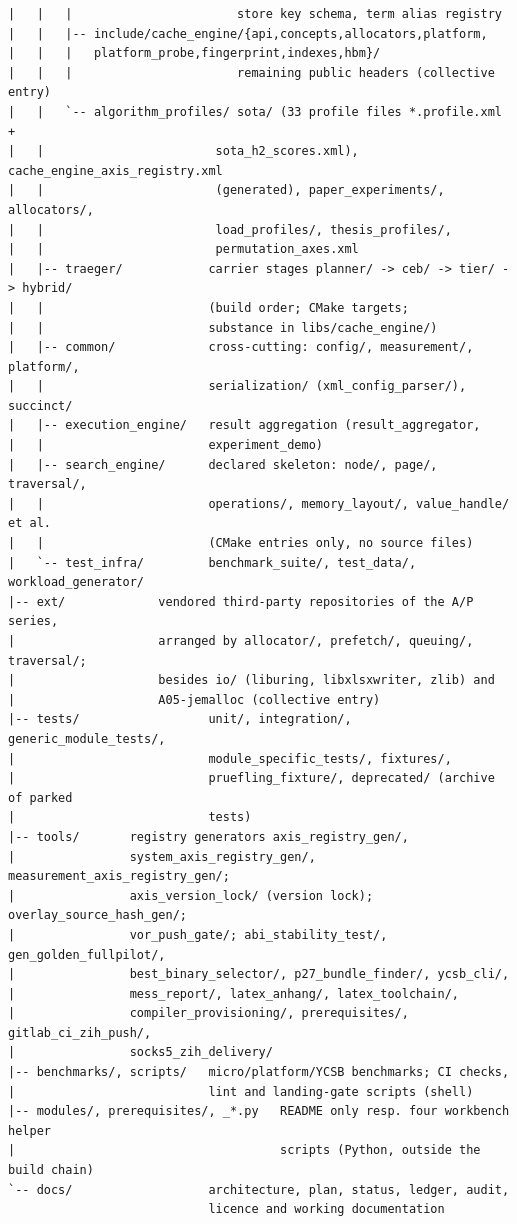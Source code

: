 {\begin{verbatim}
|   |   |                       store key schema, term alias registry
|   |   |-- include/cache_engine/{api,concepts,allocators,platform,
|   |   |   platform_probe,fingerprint,indexes,hbm}/
|   |   |                       remaining public headers (collective entry)
|   |   `-- algorithm_profiles/ sota/ (33 profile files *.profile.xml +
|   |                        sota_h2_scores.xml), cache_engine_axis_registry.xml
|   |                        (generated), paper_experiments/, allocators/,
|   |                        load_profiles/, thesis_profiles/,
|   |                        permutation_axes.xml
|   |-- traeger/            carrier stages planner/ -> ceb/ -> tier/ -> hybrid/
|   |                       (build order; CMake targets;
|   |                       substance in libs/cache_engine/)
|   |-- common/             cross-cutting: config/, measurement/, platform/,
|   |                       serialization/ (xml_config_parser/), succinct/
|   |-- execution_engine/   result aggregation (result_aggregator,
|   |                       experiment_demo)
|   |-- search_engine/      declared skeleton: node/, page/, traversal/,
|   |                       operations/, memory_layout/, value_handle/ et al.
|   |                       (CMake entries only, no source files)
|   `-- test_infra/         benchmark_suite/, test_data/, workload_generator/
|-- ext/             vendored third-party repositories of the A/P series,
|                    arranged by allocator/, prefetch/, queuing/, traversal/;
|                    besides io/ (liburing, libxlsxwriter, zlib) and
|                    A05-jemalloc (collective entry)
|-- tests/                  unit/, integration/, generic_module_tests/,
|                           module_specific_tests/, fixtures/,
|                           pruefling_fixture/, deprecated/ (archive of parked
|                           tests)
|-- tools/       registry generators axis_registry_gen/,
|                system_axis_registry_gen/, measurement_axis_registry_gen/;
|                axis_version_lock/ (version lock); overlay_source_hash_gen/;
|                vor_push_gate/; abi_stability_test/, gen_golden_fullpilot/,
|                best_binary_selector/, p27_bundle_finder/, ycsb_cli/,
|                mess_report/, latex_anhang/, latex_toolchain/,
|                compiler_provisioning/, prerequisites/, gitlab_ci_zih_push/,
|                socks5_zih_delivery/
|-- benchmarks/, scripts/   micro/platform/YCSB benchmarks; CI checks,
|                           lint and landing-gate scripts (shell)
|-- modules/, prerequisites/, _*.py   README only resp. four workbench helper
|                                     scripts (Python, outside the build chain)
`-- docs/                   architecture, plan, status, ledger, audit,
                            licence and working documentation
\end{verbatim}
}

